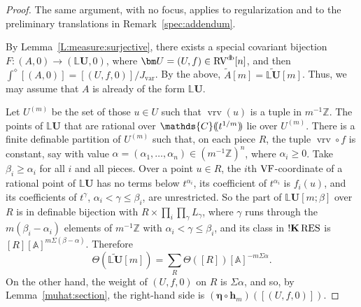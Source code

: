 \documentclass[12pt]{amsart}
\theoremstyle{plain}
\theoremstyle{definition}
\theoremstyle{remark}
\numberwithin{equation}{section}
\theoremstyle{plain}
\newcommand{\VF}{\textup{VF}}
\newcommand{\RV}{\textup{RV}}
\newcommand{\Z}{\mathds{Z}}
\newcommand{\A}{\mathds{A}}
\newcommand{\C}{\mathds{C}}
\newcommand{\0}{\emptyset}
\newcommand{\dpar}[1]{%
   (\mkern-4mu (#1 )\mkern-4mu )}
\newcommand{\bb}[1]{\mathbb{#1}}
\newcommand{\fun}{\longrightarrow}
\newcommand{\RES}{\textup{RES}}
\DeclareMathOperator{\sggk}{!\mathbf{K}}
\DeclareMathOperator{\vrv}{vrv}
\DeclareMathOperator{\db}{d \! b}
\begin{document}
\begin{proof}
The same argument, with no focus, applies to regularization and to the preliminary translations in Remark~\ref{spec:addendum}.

By Lemma~\ref{L:measure:surjective}, there exists a special covariant bijection $F : (A, 0) \fun (\bb L \bm U, 0)$, where $\bm U = (U, f) \in \RV^{\db}[n]$, and then $\int^\diamond [(A, 0)] = [(U, f, 0)] / J_{\mathrm{var}}$. By the above, $\tilde A[m] = \widetilde{\bb L \bm U}[m]$. Thus, we may assume that $A$ is already of the form $\bb L \bm U$.

Let $U^{(m)}$ be the set of those $u \in U$ such that $\vrv(u)$ is a tuple in $m^{-1}\Z$. The points of $\bb L \bm U$ that are rational over $\C \dpar{t^{1/m}}$ lie over $U^{(m)}$. There is a finite definable partition of $U^{(m)}$ such that, on each piece $R$, the tuple $\vrv \circ f$ is constant, say with value $\alpha = (\alpha_1, \ldots, \alpha_n) \in (m^{-1}\Z)^n$, where $\alpha_i \geq 0$. Take $\beta_i \geq \alpha_i$ for all $i$ and all pieces. Over a point $u \in R$, the $i$th $\VF$-coordinate of a rational point of $\bb L \bm U$ has no terms below $t^{\alpha_i}$, its coefficient of $t^{\alpha_i}$ is $f_i(u)$, and its coefficients of $t^\gamma$, $\alpha_i < \gamma \leq \beta_i$, are unrestricted. So the part of $\bb L \bm U[m;\beta]$ over $R$ is in definable bijection with $R \times \prod_i \prod_\gamma L_\gamma$, where $\gamma$ runs through the $m(\beta_i - \alpha_i)$ elements of $m^{-1}\Z$ with $\alpha_i < \gamma \leq \beta_i$, and its class in $\sggk \RES$ is $[R] [\A]^{m \Sigma (\beta - \alpha)}$. Therefore
\[
\Theta(\widetilde{\bb L \bm U}[m]) = \sum_R \Theta([R]) [\A]^{-m \Sigma \alpha}.
\]
On the other hand, the weight of $(U, f, 0)$ on $R$ is $\Sigma \alpha$, and so, by Lemma~\ref{muhat:section}, the right-hand side is $(\bm \eta \circ \bm h_m)([(U, f, 0)])$.
\end{proof}
\end{document}
